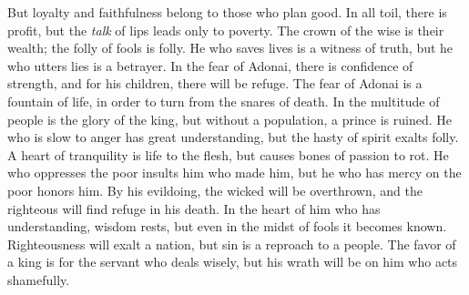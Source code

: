 \begin{biblechapter}
But loyalty and faithfulness belong to those who plan good.
\verse In all toil, there is profit, 
but the \textit{talk} of lips leads only to poverty.
\verse The crown of the wise is their wealth; 
the folly of fools is folly.
\verse He who saves lives is a witness of truth, 
but he who utters lies is a betrayer.
\verse In the fear of Adonai, there is confidence of strength, 
and for his children, there will be refuge.
\verse The fear of Adonai is a fountain of life, 
in order to turn from the snares of death.
\verse In the multitude of people is the glory of the king, 
but without a population, a prince is ruined.
\verse He who is slow to anger has great understanding, 
but the hasty of spirit exalts folly.
\verse A heart of tranquility is life to the flesh, 
but causes bones of passion to rot.
\verse He who oppresses the poor insults him who made him, 
but he who has mercy on the poor honors him.
\verse By his evildoing, the wicked will be overthrown, 
and the righteous will find refuge in his death.
\verse In the heart of him who has understanding, wisdom rests, 
but even in the midst of fools it becomes known.
\verse Righteousness will exalt a nation, 
but sin is a reproach to a people.
\verse The favor of a king is for the servant who deals wisely, 
but his wrath will be on him who acts shamefully.
\end{biblechapter}

